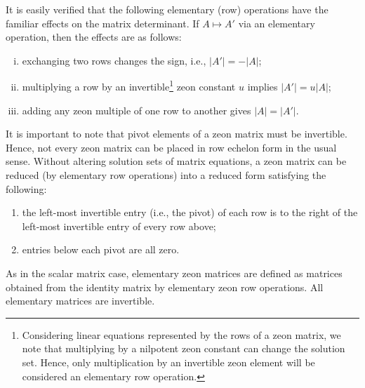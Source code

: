 \documentclass{article}
\theoremstyle{definition}
\numberwithin{equation}{section}
\begin{document}
It is easily verified that the following elementary (row) operations have the familiar effects on the matrix determinant.   If $A\mapsto A'$ via an elementary operation, then the effects are as follows:
\begin{enumerate}[i.]
\item exchanging two rows changes the sign, i.e., $|A'|=-|A|$;
\item multiplying a row by an invertible\footnote{Considering linear equations represented by the rows of a zeon matrix, we note that multiplying by a nilpotent zeon constant can change the solution set.  Hence, only multiplication by an invertible zeon element will be considered an elementary row operation.} zeon constant $u$ implies $|A'|=u|A|$;
\item adding any zeon multiple of one row to another gives $|A|=|A'|$.
\end{enumerate}

It is important to note that pivot elements of a zeon matrix must be invertible.  Hence, not every zeon matrix can be placed in row echelon form in the usual sense.   Without altering solution sets of matrix equations, a zeon matrix can be reduced (by elementary row operations) into a reduced form satisfying the following:
\begin{enumerate}
\item the left-most invertible entry (i.e., the pivot) of each row is to the right of the left-most invertible entry of every row above;
\item entries below each pivot are all zero.
\end{enumerate}

As in the scalar matrix case, elementary zeon matrices are defined as matrices obtained from the identity matrix by elementary zeon row operations.   All elementary matrices are invertible. 
\end{document}
